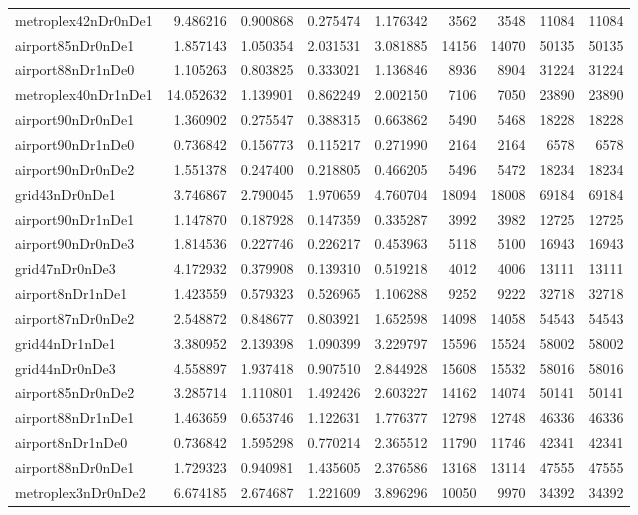 \begin{longtable}{|l|r|r|r|r|r|r|r|r|}
metroplex42nDr0nDe1 & 9.486216 & 0.900868 & 0.275474 & 1.176342 & 3562 & 3548 & 11084 & 11084 \\
airport85nDr0nDe1 & 1.857143 & 1.050354 & 2.031531 & 3.081885 & 14156 & 14070 & 50135 & 50135 \\
airport88nDr1nDe0 & 1.105263 & 0.803825 & 0.333021 & 1.136846 & 8936 & 8904 & 31224 & 31224 \\
metroplex40nDr1nDe1 & 14.052632 & 1.139901 & 0.862249 & 2.002150 & 7106 & 7050 & 23890 & 23890 \\
airport90nDr0nDe1 & 1.360902 & 0.275547 & 0.388315 & 0.663862 & 5490 & 5468 & 18228 & 18228 \\
airport90nDr1nDe0 & 0.736842 & 0.156773 & 0.115217 & 0.271990 & 2164 & 2164 & 6578 & 6578 \\
airport90nDr0nDe2 & 1.551378 & 0.247400 & 0.218805 & 0.466205 & 5496 & 5472 & 18234 & 18234 \\
grid43nDr0nDe1 & 3.746867 & 2.790045 & 1.970659 & 4.760704 & 18094 & 18008 & 69184 & 69184 \\
airport90nDr1nDe1 & 1.147870 & 0.187928 & 0.147359 & 0.335287 & 3992 & 3982 & 12725 & 12725 \\
airport90nDr0nDe3 & 1.814536 & 0.227746 & 0.226217 & 0.453963 & 5118 & 5100 & 16943 & 16943 \\
grid47nDr0nDe3 & 4.172932 & 0.379908 & 0.139310 & 0.519218 & 4012 & 4006 & 13111 & 13111 \\
airport8nDr1nDe1 & 1.423559 & 0.579323 & 0.526965 & 1.106288 & 9252 & 9222 & 32718 & 32718 \\
airport87nDr0nDe2 & 2.548872 & 0.848677 & 0.803921 & 1.652598 & 14098 & 14058 & 54543 & 54543 \\
grid44nDr1nDe1 & 3.380952 & 2.139398 & 1.090399 & 3.229797 & 15596 & 15524 & 58002 & 58002 \\
grid44nDr0nDe3 & 4.558897 & 1.937418 & 0.907510 & 2.844928 & 15608 & 15532 & 58016 & 58016 \\
airport85nDr0nDe2 & 3.285714 & 1.110801 & 1.492426 & 2.603227 & 14162 & 14074 & 50141 & 50141 \\
airport88nDr1nDe1 & 1.463659 & 0.653746 & 1.122631 & 1.776377 & 12798 & 12748 & 46336 & 46336 \\
airport8nDr1nDe0 & 0.736842 & 1.595298 & 0.770214 & 2.365512 & 11790 & 11746 & 42341 & 42341 \\
airport88nDr0nDe1 & 1.729323 & 0.940981 & 1.435605 & 2.376586 & 13168 & 13114 & 47555 & 47555 \\
metroplex3nDr0nDe2 & 6.674185 & 2.674687 & 1.221609 & 3.896296 & 10050 & 9970 & 34392 & 34392 \\

\end{longtable}
